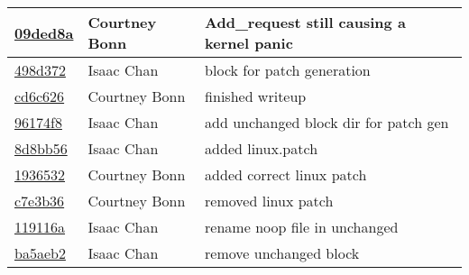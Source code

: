 \begin{tabular}{p{2cm} p{2cm} p{10cm}}
\href{https://github.com/courtbonn/CS-444/commit/09ded8afcdf70a8b47e7035542c62d93e76d51dd}{09ded8a} & Courtney Bonn & Add\_request still causing a kernel panic\\\hline
\href{https://github.com/courtbonn/CS-444/commit/498d37252ce619ec5b677dfd70ea2dd315daae75}{498d372} & Isaac Chan & block for patch generation\\\hline
\href{https://github.com/courtbonn/CS-444/commit/cd6c6269ddabeed3e7a761cc42041564bff86d4f}{cd6c626} & Courtney Bonn & finished writeup\\\hline
\href{https://github.com/courtbonn/CS-444/commit/96174f8ba4be80b2cb15a629ad468998537600ea}{96174f8} & Isaac Chan & add unchanged block dir for patch gen\\\hline
\href{https://github.com/courtbonn/CS-444/commit/8d8bb56c6b4e6287ad20283cba4560f59e3e21dd}{8d8bb56} & Isaac Chan & added linux.patch\\\hline
\href{https://github.com/courtbonn/CS-444/commit/193653232e83d3b72dab544abc48d95c78bb2e2c}{1936532} & Courtney Bonn & added correct linux patch\\\hline
\href{https://github.com/courtbonn/CS-444/commit/c7e3b36a90dc324a0bd24af5bbebe27b8f2cd352}{c7e3b36} & Courtney Bonn & removed linux patch\\\hline
\href{https://github.com/courtbonn/CS-444/commit/119116a604998aba96ad0479b6309bbd25d10019}{119116a} & Isaac Chan & rename noop file in unchanged\\\hline
\href{https://github.com/courtbonn/CS-444/commit/ba5aeb22ab9d21ca25fc05605a65288d43e52762}{ba5aeb2} & Isaac Chan & remove unchanged block\\\hline\end{tabular}
